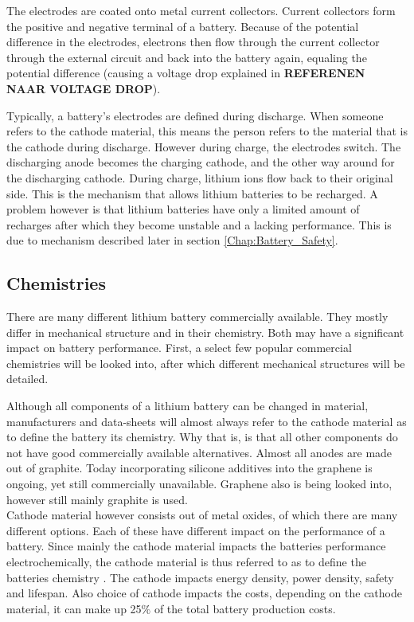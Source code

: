 The electrodes are coated onto metal current collectors. Current collectors form the positive and negative terminal of a battery. Because of the potential difference in the electrodes, electrons then flow through the current collector through the external circuit and back into the battery again, equaling the potential difference (causing a voltage drop explained in \textbf{REFERENEN NAAR VOLTAGE DROP}).

Typically, a battery's electrodes are defined during discharge. When someone refers to the cathode material, this means the person refers to the material that is the cathode during discharge. However during charge, the electrodes switch. The discharging anode becomes the charging cathode, and the other way around for the discharging cathode. During charge, lithium ions flow back to their original side. This is the mechanism that allows lithium batteries to be recharged. A problem however is that lithium batteries have only a limited amount of recharges after which they become unstable and a lacking performance. This is due to mechanism described later in section \ref{Chap:Battery_Safety}.

\subsection{Chemistries}
There are many different lithium battery commercially available. They mostly differ in mechanical structure and in their chemistry. Both may have a significant impact on battery performance. First, a select few popular commercial chemistries will be looked into, after which different mechanical structures will be detailed. 

Although all components of a lithium battery can be changed in material, manufacturers and data-sheets will almost always refer to the cathode material as to define the battery its chemistry. Why that is, is that all other components do not have good commercially available alternatives. Almost all anodes are made out of graphite. Today incorporating silicone additives into the graphene is ongoing, yet still commercially unavailable. Graphene also is being looked into, however still mainly graphite is used. \\
Cathode material however consists out of metal oxides, of which there are many different options. Each of these have different impact on the performance of a battery. Since mainly the cathode material impacts the batteries performance electrochemically, the cathode material is thus referred to as to define the batteries chemistry \cite{cathode}. The cathode impacts energy density, power density, safety and lifespan. Also choice of cathode impacts the costs, depending on the cathode material, it can make up 25$\%$ of the total battery production costs. \cite{cathode}\cite{cobalt}

